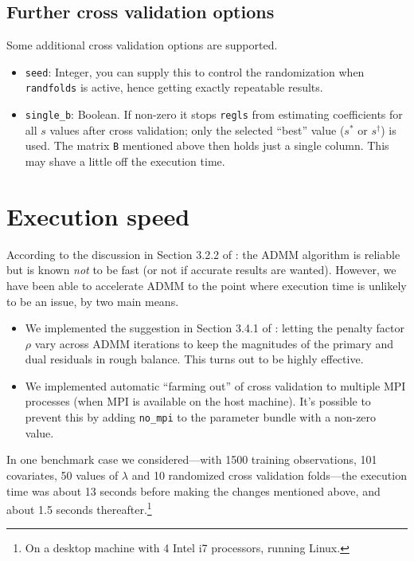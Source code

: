 \documentclass{article}
\begin{document}
\subsection*{Further cross validation options}

Some additional cross validation options are supported.

\begin{itemize}
\item \texttt{seed}: Integer, you can supply this to control the
  randomization when \texttt{randfolds} is active, hence getting
  exactly repeatable results.
\item \texttt{single\_b}: Boolean. If non-zero it stops \texttt{regls}
  from estimating coefficients for all $s$ values after cross
  validation; only the selected ``best'' value ($s^*$ or
  $s^{\dagger}$) is used. The matrix \texttt{B} mentioned above
  then holds just a single column. This may shave a little off the
  execution time.
\end{itemize}

\section{Execution speed}
\label{sec:speed}

According to the discussion in Section 3.2.2 of \cite{boyd2010}: the
ADMM algorithm is reliable but is known \textit{not} to be fast (or
not if accurate results are wanted). However, we have been able to
accelerate ADMM to the point where execution time is unlikely to be an
issue, by two main means.
\begin{itemize}
\item We implemented the suggestion in Section 3.4.1 of
  \cite{boyd2010}: letting the penalty factor $\rho$ vary across ADMM
  iterations to keep the magnitudes of the primary and dual residuals
  in rough balance. This turns out to be highly effective.
\item We implemented automatic ``farming out'' of cross validation to
  multiple \textsf{MPI} processes (when \textsf{MPI} is available on
  the host machine). It's possible to prevent this by adding
  \texttt{no\_mpi} to the parameter bundle with a non-zero value.
\end{itemize}
In one benchmark case we considered---with 1500 training observations,
101 covariates, 50 values of $\lambda$ and 10 randomized cross
validation folds---the execution time was about 13 seconds before
making the changes mentioned above, and about 1.5 seconds
thereafter.\footnote{On a desktop machine with 4 Intel i7 processors,
  running Linux.}
\end{document}
